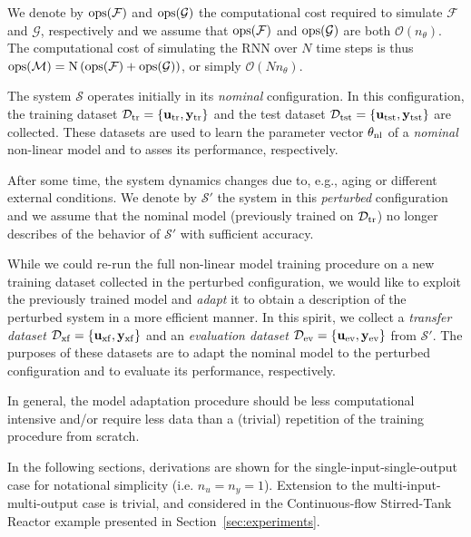 \documentclass{article}
\newcommand{\nsamp}{{N}}
\newcommand{\npar}{{n_\theta}}
\newcommand{\M}{\mathcal{M}}
\newcommand{\F}{\mathcal{F}}
\newcommand{\G}{\mathcal{G}}
\newcommand{\D}{\mathcal{D}}
\newcommand{\sys}{{\mathcal{S}}}
\newcommand{\tr}{{\rm{tr}}}
\newcommand{\tst}{{\rm{tst}}}
\newcommand{\transf}{{\rm{xf}}}
\newcommand{\eval}{{\rm{ev}}}
\newcommand{\ops}{\rm{ops}}
\newcommand{\nominal}{{\rm{nl}}}
\newcommand{\tvec}[1]{{\mathbf{#1}}}
\begin{document}
We denote by $\ops(\F)$ and $\ops(\G)$ the computational cost required to simulate $\F$ and $\G$, respectively and we assume that $\ops(\F)$ and $\ops(\G)$ are both $\mathcal{O}(\npar)$.
The computational cost of simulating the RNN over $\nsamp$ time
steps is thus $\ops(\M) = \nsamp \left(\ops(\F) + \ops(\G)\right)$, 
or simply $\mathcal{O}(\nsamp \npar)$.



The system  $\sys$ operates initially in its \emph{nominal} configuration. In this configuration, the training dataset $\D_\tr = \{\tvec{u}_\tr, \tvec{y}_\tr\}$ and the test dataset 
$\D_\tst = \{\tvec{u}_\tst, \tvec{y}_\tst\}$ are collected. These datasets are used to 
learn the parameter vector $\theta_\nominal$ of a \emph{nominal} non-linear model 
and to asses its performance, respectively.

After some time, the system dynamics changes due to, e.g., aging or different external conditions.
We denote by $\sys'$ the system in this \emph{perturbed} configuration and we assume that the nominal model
(previously trained on $\D_\tr$) no longer describes of the behavior of $\sys'$ with sufficient accuracy.

While we could re-run the full non-linear model training procedure on a new training dataset collected in the perturbed configuration, we would like to exploit the previously trained model and \emph{adapt} it to obtain a description of the perturbed system in a more efficient manner.  In this spirit, we collect a \emph{transfer dataset} $\D_\transf = \{\tvec{u}_\transf, \tvec{y}_\transf\}$ and an \emph{evaluation dataset} $\D_\eval = \{\tvec{u}_\eval, \tvec{y}_\eval\}$ from $\sys'$. The purposes of these datasets are to adapt the nominal model to the perturbed configuration and to evaluate its performance, respectively.

In general, the model adaptation procedure should be less computational intensive and/or require less data than a (trivial) repetition of the training procedure from scratch.

In the following sections, derivations are shown for the single-input-single-output case for notational simplicity (i.e. $n_u = n_{y} = 1$). Extension to the multi-input-multi-output case is trivial, and considered in the Continuous-flow Stirred-Tank Reactor example presented in Section~\ref{sec:experiments}. 
\end{document}
